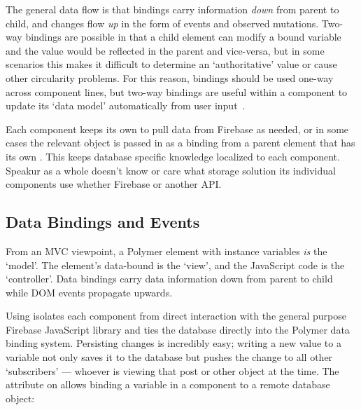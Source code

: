 The general data flow is that bindings carry information \textit{down} from parent to child, and changes flow \textit{up} in the form of events and observed mutations.
Two-way bindings are possible in that a child element can modify a bound variable and the value would be reflected in the parent and vice-versa, 
but in some scenarios this makes it difficult to determine an `authoritative' value 
or cause other circularity problems.
For this reason, bindings should be used one-way across component lines,
but two-way bindings are useful within a component to update its `data model' automatically from user input~\cite{polymercontributors2015-b}.

Each component keeps its own  to pull data from Firebase as needed,
or in some cases the relevant object is passed in as a binding from a parent element that has its own .
This keeps database specific knowledge localized to each component.
Speakur as a whole doesn't know or care what storage solution its individual components use whether Firebase or another API.

\subsection{Data Bindings and Events}
\label{sec:databindings}
From an MVC viewpoint, a Polymer element with instance variables \textit{is} the `model'.
The element's data-bound  is the `view', 
and the JavaScript code is the `controller'.
Data bindings carry data information down from parent to child while DOM events propagate upwards.

Using  isolates each component from direct interaction with the general purpose Firebase JavaScript library
and ties the database directly into the Polymer data binding system.
Persisting changes is incredibly easy; 
writing a new value to a variable not only saves it to the database but pushes the change
to all other `subscribers' --- whoever is viewing that post or other object at the time.
The  attribute on 
allows binding a variable in a component to a remote database object:

